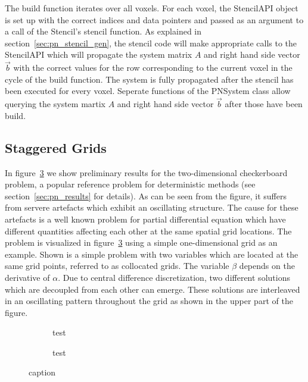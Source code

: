 The build function iterates over all voxels. For each voxel, the StencilAPI object is set up with the correct indices and data pointers and passed as an argument to a call of the Stencil's stencil function. As explained in section~\ref{sec:pn_stencil_gen}, the stencil code will make appropriate calls to the StencilAPI which will propagate the system matrix $A$ and right hand side vector $\vec{b}$ with the correct values for the row corresponding to the current voxel in the cycle of the build function. The system is fully propagated after the stencil has been executed for every voxel. Seperate functions of the PNSystem class allow querying the system martix $A$ and right hand side vector $\vec{b}$ after those have been build.

\subsection{Staggered Grids}
\label{sec:pn_staggered}

In figure~\ref{fig:pn_staggered_grid_problems} we show preliminary results for the two-dimensional checkerboard problem, a popular reference problem for deterministic methods (see section~\ref{sec:pn_results} for details). As can be seen from the figure, it suffers from servere artefacts which exhibit an oscillating structure. The cause for these artefacts is a well known problem for partial differential equation which have different quantities affecting each other at the same spatial grid locations. The problem is visualized in figure~\ref{fig:pn_staggered_grid_problems} using a simple one-dimensional grid as an example. Shown is a simple problem with two variables which are located at the same grid points, referred to as collocated grids. The variable $\beta$ depends on the derivative of $\alpha$. Due to central difference discretization, two different solutions which are decoupled from each other can emerge. These solutions are interleaved in an oscillating pattern throughout the grid as shown in the upper part of the figure.

\begin{figure}[h]
\centering
\begin{subfigure}{0.49\columnwidth}
\caption{test}
\label{fig:pn_collocated_grid_artefacts}
\end{subfigure}%
\hspace{0.01\columnwidth}
\begin{subfigure}{0.49\columnwidth}
\caption{test}
\label{fig:pn_staggered_grid_idea}
\end{subfigure}%
\caption{caption}
\label{fig:pn_staggered_grid_problems}
\end{figure}

